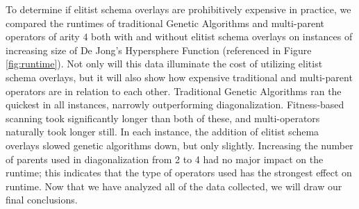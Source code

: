 To determine if elitist schema overlays are prohibitively expensive in practice, we compared the runtimes of traditional Genetic Algorithms and multi-parent operators of arity $4$ both with and without elitist schema overlays on instances of increasing size of De Jong's Hypersphere Function (referenced in Figure \ref{fig:runtime}). Not only will this data illuminate the cost of utilizing elitist schema overlays, but it will also show how expensive traditional and multi-parent operators are in relation to each other. Traditional Genetic Algorithms ran the quickest in all instances, narrowly outperforming diagonalization. Fitness-based scanning took significantly longer than both of these, and multi-operators naturally took longer still. In each instance, the addition of elitist schema overlays slowed genetic algorithms down, but only slightly. Increasing the number of parents used in diagonalization from 2 to 4 had no major impact on the runtime; this indicates that the type of operators used has the strongest effect on runtime. Now that we have analyzed all of the data collected, we will draw our final conclusions.